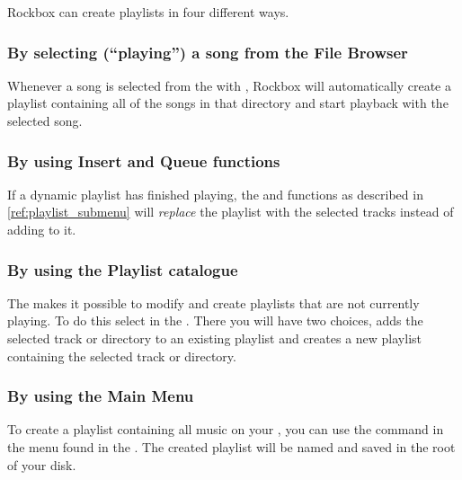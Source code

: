 Rockbox can create playlists in four different ways.

\subsubsection{By selecting (``playing'') a song from the File Browser}
Whenever a song is selected from the  with
\ActionTreeEnter, Rockbox will automatically create a playlist containing
all of the songs in that directory and start playback with the selected
song.


\subsubsection{By using Insert and Queue functions}
If a dynamic playlist has finished playing, the  and
 functions as described in \ref{ref:playlist_submenu} will
\emph{replace} the playlist with the selected tracks instead of adding to it.

\subsubsection{\label{ref:playlist_catalogue}By using the Playlist catalogue}
The  makes it possible to modify and create
playlists that are not currently playing. To do this select  in the . There you will have two choices,
 adds the selected track or directory to an existing
playlist and  creates a new playlist containing
the selected track or directory.


\subsubsection{By using the Main Menu}
To create a playlist containing all music on your \dap{}, you can use the
 command in the  menu found
in the . The created playlist will be named
 and saved in the root of your \daps{} disk.

